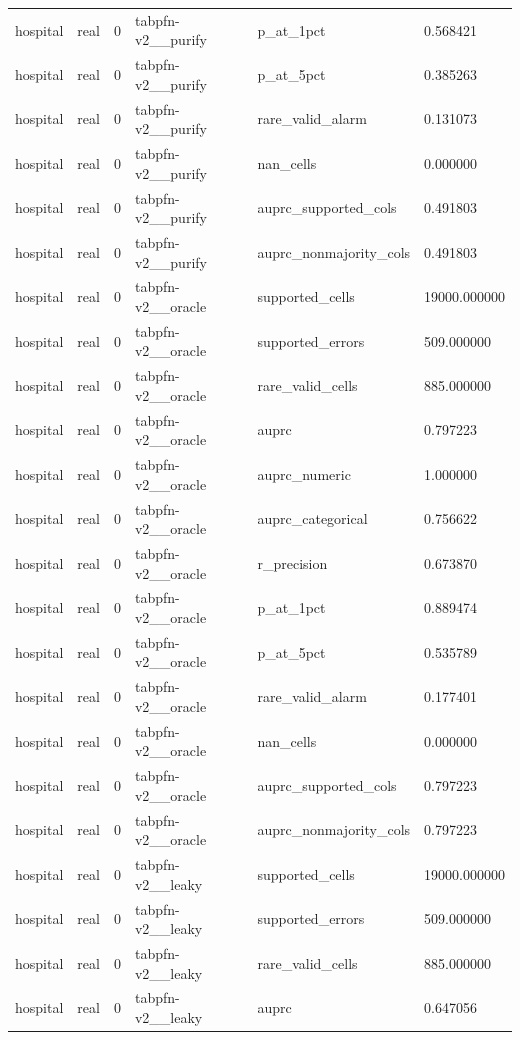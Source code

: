 \begin{tabular}{llllll}
hospital & real & 0 & tabpfn-v2\_\_purify & p\_at\_1pct & 0.568421 \\
hospital & real & 0 & tabpfn-v2\_\_purify & p\_at\_5pct & 0.385263 \\
hospital & real & 0 & tabpfn-v2\_\_purify & rare\_valid\_alarm & 0.131073 \\
hospital & real & 0 & tabpfn-v2\_\_purify & nan\_cells & 0.000000 \\
hospital & real & 0 & tabpfn-v2\_\_purify & auprc\_supported\_cols & 0.491803 \\
hospital & real & 0 & tabpfn-v2\_\_purify & auprc\_nonmajority\_cols & 0.491803 \\
hospital & real & 0 & tabpfn-v2\_\_oracle & supported\_cells & 19000.000000 \\
hospital & real & 0 & tabpfn-v2\_\_oracle & supported\_errors & 509.000000 \\
hospital & real & 0 & tabpfn-v2\_\_oracle & rare\_valid\_cells & 885.000000 \\
hospital & real & 0 & tabpfn-v2\_\_oracle & auprc & 0.797223 \\
hospital & real & 0 & tabpfn-v2\_\_oracle & auprc\_numeric & 1.000000 \\
hospital & real & 0 & tabpfn-v2\_\_oracle & auprc\_categorical & 0.756622 \\
hospital & real & 0 & tabpfn-v2\_\_oracle & r\_precision & 0.673870 \\
hospital & real & 0 & tabpfn-v2\_\_oracle & p\_at\_1pct & 0.889474 \\
hospital & real & 0 & tabpfn-v2\_\_oracle & p\_at\_5pct & 0.535789 \\
hospital & real & 0 & tabpfn-v2\_\_oracle & rare\_valid\_alarm & 0.177401 \\
hospital & real & 0 & tabpfn-v2\_\_oracle & nan\_cells & 0.000000 \\
hospital & real & 0 & tabpfn-v2\_\_oracle & auprc\_supported\_cols & 0.797223 \\
hospital & real & 0 & tabpfn-v2\_\_oracle & auprc\_nonmajority\_cols & 0.797223 \\
hospital & real & 0 & tabpfn-v2\_\_leaky & supported\_cells & 19000.000000 \\
hospital & real & 0 & tabpfn-v2\_\_leaky & supported\_errors & 509.000000 \\
hospital & real & 0 & tabpfn-v2\_\_leaky & rare\_valid\_cells & 885.000000 \\
hospital & real & 0 & tabpfn-v2\_\_leaky & auprc & 0.647056 \\

\end{tabular}

